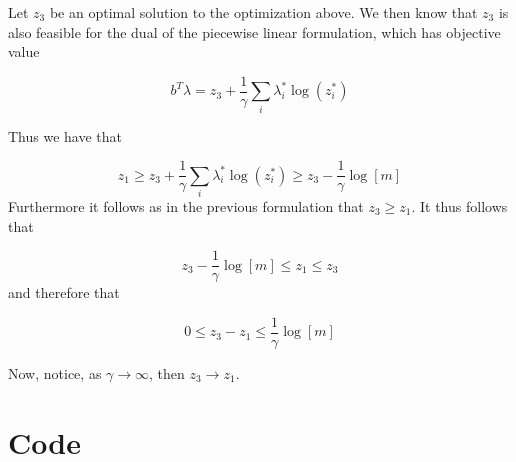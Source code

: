 \documentclass[answers]{exam} %
\begin{document}
\begin{itemize}
\begin{framed}
Let $z_3$ be an optimal solution to the optimization above. We then know that $z_3$ is also feasible for the dual of the piecewise
linear formulation, which has objective value 

\[
b^T \lambda = z_3 +   \frac{1}{\gamma} \sum_{i} \lambda_i^{*} \log(z_i^*)
\]

Thus we have that

\[
z_1 \geq  z_3 +   \frac{1}{\gamma} \sum_{i}\lambda_i^{*} \log(z_i^*) \geq z_3 -  \frac{1}{\gamma} \log[m]
\]
Furthermore it follows as in the previous formulation that $z_3 \geq z_1$.
It thus follows that 

\[
z_3 - \frac{1}{\gamma} \log[m] \leq z_1 \leq z_3 
\]
and therefore that

\[
0 \leq z_3 - z_1 \leq \frac{1}{\gamma} \log[m]
\]


Now, notice, as  $\gamma \to \infty$, then $z_3 \to z_1$. 

\end{framed}
\end{itemize}

\section*{Code}

         
      
 
        
  

     
     
        
 
        
   

\end{document}
